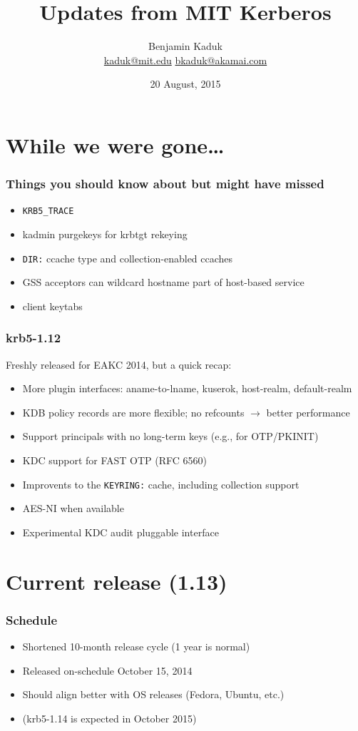 \documentclass{beamer}
\title{Updates from MIT Kerberos}
\author{Benjamin Kaduk \\ \url{kaduk@mit.edu} \url{bkaduk@akamai.com}}
\date{20 August, 2015}
\begin{document}
\AtBeginSection[]
{
    \begin{frame}
	\tableofcontents[currentsection]
    \end{frame}
}

\frame{\titlepage}

\section{While we were gone\ldots{}}

\begin{frame}[fragile]
\frametitle{Things you should know about but might have missed}
\begin{itemize}
\item{\verb+KRB5_TRACE+}
\item{kadmin purgekeys for krbtgt rekeying}
\item{\verb+DIR:+ ccache type and collection-enabled ccaches}
\item{GSS acceptors can wildcard hostname part of host-based service}
\item{client keytabs}
\end{itemize}
\end{frame}

\begin{frame}[fragile]
\frametitle{krb5-1.12}
Freshly released for EAKC 2014, but a quick recap:
\begin{itemize}
\item{More plugin interfaces: aname-to-lname, kuserok, host-realm,
	default-realm}
\item{KDB policy records are more flexible; no refcounts $\rightarrow$
	better performance}
\item{Support principals with no long-term keys (e.g., for OTP/PKINIT)}
\item{KDC support for FAST OTP (RFC 6560)}
\item{Improvents to the \verb+KEYRING:+ cache, including collection support}
\item{AES-NI when available}
\item{Experimental KDC audit pluggable interface}
\end{itemize}
\end{frame}

\section{Current release (1.13)}

\begin{frame}
\frametitle{Schedule}
\begin{itemize}
\item{Shortened 10-month release cycle (1 year is normal)}
\item{Released on-schedule October 15, 2014}
\item{Should align better with OS releases (Fedora, Ubuntu, etc.)}
\item{(krb5-1.14 is expected in October 2015)}
\end{itemize}
\end{frame}
\end{document}
